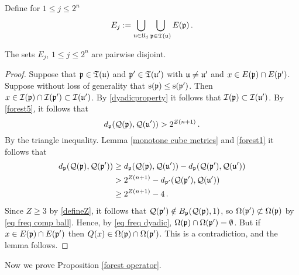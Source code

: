 {Define for $1 \le j \le 2^n$
$$
    E_j := \bigcup_{\mathfrak u \in \mathfrak U_j} \bigcup_{\mathfrak p \in \mathfrak T(\mathfrak u)} E(\mathfrak p)\,.
$$

\begin{lemma}
    \label{lem disjoint support}
    The sets $E_j$, $1 \le j \le 2^n$ are pairwise disjoint.
\end{lemma}

\begin{proof}
    Suppose that $\mathfrak p \in \mathfrak T(\mathfrak u)$ and $\mathfrak p' \in \mathfrak T(\mathfrak u')$ with $\mathfrak u \ne \mathfrak u'$ and $x \in E(\mathfrak p) \cap E(\mathfrak p')$. Suppose without loss of generality that $\mathrm{s}(\mathfrak p) \le \mathrm{s}(\mathfrak p')$. Then $x \in \mathcal{I}(\mathfrak p) \cap \mathcal{I}(\mathfrak p') \subset \mathcal{I}(\mathfrak u')$. By \eqref{dyadicproperty} it follows that $\mathcal{I}(\mathfrak p) \subset \mathcal{I}(\mathfrak u')$. By \eqref{forest5}, it follows that
    $$
        d_{\mathfrak p}(\mathcal{Q}(\mathfrak p), \mathcal{Q}(\mathfrak u')) > 2^{Z(n+1)}\,.
    $$
    By the triangle inequality. Lemma \ref{monotone cube metrics} and \eqref{forest1} it follows that
    \begin{align*}
        d_{\mathfrak p}(\mathcal{Q}(\mathfrak p), \mathcal{Q}(\mathfrak p')) &\ge d_{\mathfrak p}(\mathcal{Q}(\mathfrak p), \mathcal{Q}(\mathfrak u')) - d_{\mathfrak p}(\mathcal{Q}(\mathfrak p'), \mathcal{Q}(\mathfrak u'))\\
        &> 2^{Z(n+1)} - d_{\mathfrak p'}(\mathcal{Q}(\mathfrak p'), \mathcal{Q}(\mathfrak u'))\\
        &\ge 2^{Z(n+1)} - 4\,.
    \end{align*}
    Since $Z \ge 3$ by \eqref{defineZ}, it follows that $\mathcal{Q}(\mathfrak p') \notin B_{\mathfrak p}(\mathcal{Q}(\mathfrak p), 1)$, so $\Omega(\mathfrak p') \not\subset \Omega(\mathfrak p)$ by \eqref{eq freq comp ball}. Hence, by \eqref{eq freq dyadic}, $\Omega(\mathfrak p) \cap \Omega(\mathfrak p') = \emptyset$. But if $x \in E(\mathfrak p) \cap E(\mathfrak p')$ then $Q(x) \in \Omega(\mathfrak p) \cap \Omega(\mathfrak p')$. This is a contradiction, and the lemma follows.
\end{proof}

Now we prove Proposition \ref{forest operator}.

}
